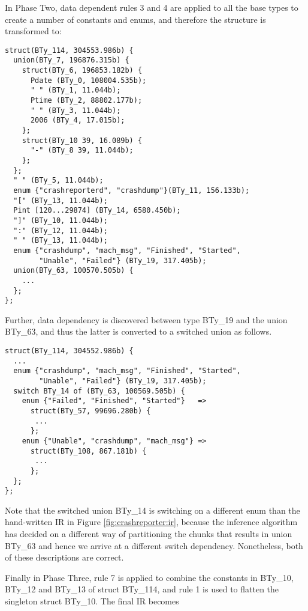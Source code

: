 In Phase Two, data dependent rules 3 and 4 are applied to all the base types to 
create a number of constants and enums, and therefore the structure is
transformed to: 
{\small
\begin{verbatim}
struct(BTy_114, 304553.986b) {
  union(BTy_7, 196876.315b) {
    struct(BTy_6, 196853.182b) {
      Pdate (BTy_0, 108004.535b);
      " " (BTy_1, 11.044b);
      Ptime (BTy_2, 88802.177b);
      " " (BTy_3, 11.044b);
      2006 (BTy_4, 17.015b);
    };
    struct(BTy_10 39, 16.089b) {
      "-" (BTy_8 39, 11.044b);
    };
  };
  " " (BTy_5, 11.044b);
  enum {"crashreporterd", "crashdump"}(BTy_11, 156.133b);
  "[" (BTy_13, 11.044b);
  Pint [120...29874] (BTy_14, 6580.450b);
  "]" (BTy_10, 11.044b);
  ":" (BTy_12, 11.044b);
  " " (BTy_13, 11.044b);
  enum {"crashdump", "mach_msg", "Finished", "Started", 
        "Unable", "Failed"} (BTy_19, 317.405b);
  union(BTy_63, 100570.505b) {
    ...
  };
};
\end{verbatim}
}

Further, data dependency is discovered between type BTy\_19
and the union BTy\_63, and thus the latter is converted to
a switched union as follows.

{\small
\begin{verbatim}
struct(BTy_114, 304552.986b) {
  ...
  enum {"crashdump", "mach_msg", "Finished", "Started", 
        "Unable", "Failed"} (BTy_19, 317.405b);
  switch BTy_14 of (BTy_63, 100569.505b) {
    enum {"Failed", "Finished", "Started"}   => 
      struct(BTy_57, 99696.280b) {
       ...
      };
    enum {"Unable", "crashdump", "mach_msg"} =>
      struct(BTy_108, 867.181b) {
       ...
      };
  };
};
\end{verbatim}
}

Note that the switched union BTy\_14 is switching on a different enum 
than the hand-written IR in Figure \ref{fig:crashreporter:ir}, because
the inference algorithm has decided on a different way of partitioning
the chunks that results in union BTy\_63 and hence we arrive at a 
different switch dependency. Nonetheless, both of these descriptions are
correct. 

Finally in Phase Three, rule 7 is applied to combine the constants in BTy\_10,
BTy\_12 and BTy\_13 of struct BTy\_114, and rule 1 is used to flatten
the singleton struct BTy\_10. The final IR becomes


